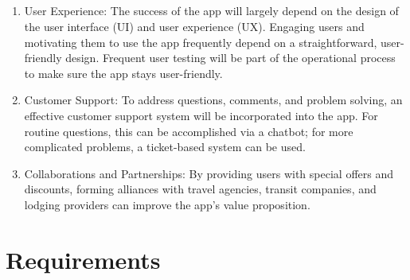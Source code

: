 \documentclass[12pt,a4paper]{report}
\begin{document}
\section{}
\begin{enumerate}

    \item User Experience: The success of the app will largely depend on the design of the user interface (UI) and user experience (UX). Engaging users and motivating them to use the app frequently depend on a straightforward, user-friendly design. Frequent user testing will be part of the operational process to make sure the app stays user-friendly.

    \item Customer Support: To address questions, comments, and problem solving, an effective customer support system will be incorporated into the app. For routine questions, this can be accomplished via a chatbot; for more complicated problems, a ticket-based system can be used.

    \item Collaborations and Partnerships: By providing users with special offers and discounts, forming alliances with travel agencies, transit companies, and lodging providers can improve the app's value proposition.
 
\end{enumerate}
\chapter{Requirements}
\end{document}
